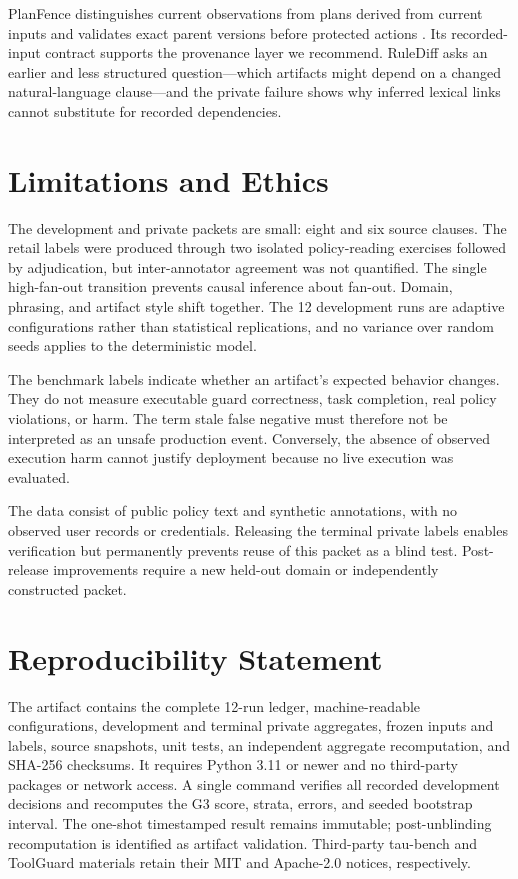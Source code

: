 \documentclass{article}
\begin{document}
PlanFence distinguishes current observations from plans derived from current inputs and validates exact parent versions before protected actions \cite{chen2026planfence}. Its recorded-input contract supports the provenance layer we recommend. RuleDiff asks an earlier and less structured question---which artifacts might depend on a changed natural-language clause---and the private failure shows why inferred lexical links cannot substitute for recorded dependencies.

\section{Limitations and Ethics}

The development and private packets are small: eight and six source clauses. The retail labels were produced through two isolated policy-reading exercises followed by adjudication, but inter-annotator agreement was not quantified. The single high-fan-out transition prevents causal inference about fan-out. Domain, phrasing, and artifact style shift together. The 12 development runs are adaptive configurations rather than statistical replications, and no variance over random seeds applies to the deterministic model.

The benchmark labels indicate whether an artifact's expected behavior changes. They do not measure executable guard correctness, task completion, real policy violations, or harm. The term stale false negative must therefore not be interpreted as an unsafe production event. Conversely, the absence of observed execution harm cannot justify deployment because no live execution was evaluated.

The data consist of public policy text and synthetic annotations, with no observed user records or credentials. Releasing the terminal private labels enables verification but permanently prevents reuse of this packet as a blind test. Post-release improvements require a new held-out domain or independently constructed packet.

\section{Reproducibility Statement}

The artifact contains the complete 12-run ledger, machine-readable configurations, development and terminal private aggregates, frozen inputs and labels, source snapshots, unit tests, an independent aggregate recomputation, and SHA-256 checksums. It requires Python 3.11 or newer and no third-party packages or network access. A single command verifies all recorded development decisions and recomputes the G3 score, strata, errors, and seeded bootstrap interval. The one-shot timestamped result remains immutable; post-unblinding recomputation is identified as artifact validation. Third-party tau-bench and ToolGuard materials retain their MIT and Apache-2.0 notices, respectively.
\end{document}
